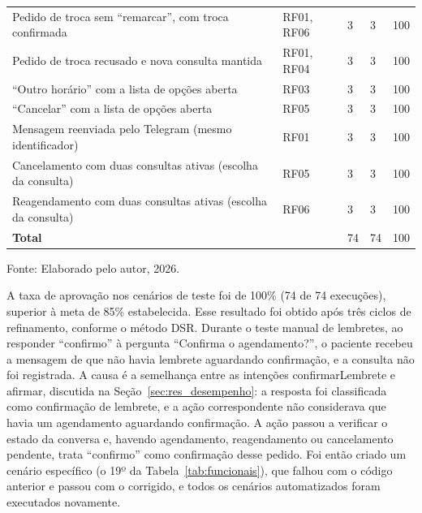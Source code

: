 \documentclass[12pt,a4paper]{extarticle}
\begin{document}
\begin{xltabular}{\textwidth}{Yp{1.6cm}p{1.8cm}p{2.6cm}p{1cm}}
Pedido de troca sem ``remarcar'', com troca confirmada & RF01, RF06 & 3 & 3 & 100 \\
Pedido de troca recusado e nova consulta mantida & RF01, RF04 & 3 & 3 & 100 \\
``Outro horário'' com a lista de opções aberta & RF03 & 3 & 3 & 100 \\
``Cancelar'' com a lista de opções aberta & RF05 & 3 & 3 & 100 \\
Mensagem reenviada pelo Telegram (mesmo identificador) & RF01 & 3 & 3 & 100 \\
Cancelamento com duas consultas ativas (escolha da consulta) & RF05 & 3 & 3 & 100 \\
Reagendamento com duas consultas ativas (escolha da consulta) & RF06 & 3 & 3 & 100 \\
\hline
\textbf{Total} & & 74 & 74 & 100 \\
\end{xltabular}
\vspace{0.3cm}

\footnotesize{Fonte: Elaborado pelo autor, 2026.}


A taxa de aprovação nos cenários de teste foi de 100\% (74 de 74 execuções), superior à meta de 85\% estabelecida. Esse resultado foi obtido após três ciclos de refinamento, conforme o método DSR. Durante o teste manual de lembretes, ao responder ``confirmo'' à pergunta ``Confirma o agendamento?'', o paciente recebeu a mensagem de que não havia lembrete aguardando confirmação, e a consulta não foi registrada. A causa é a semelhança entre as intenções confirmarLembrete e afirmar, discutida na Seção~\ref{sec:res_desempenho}: a resposta foi classificada como confirmação de lembrete, e a ação correspondente não considerava que havia um agendamento aguardando confirmação. A ação passou a verificar o estado da conversa e, havendo agendamento, reagendamento ou cancelamento pendente, trata ``confirmo'' como confirmação desse pedido. Foi então criado um cenário específico (o 19º da Tabela~\ref{tab:funcionais}), que falhou com o código anterior e passou com o corrigido, e todos os cenários automatizados foram executados novamente.
\end{document}
